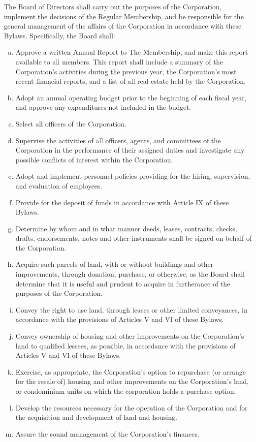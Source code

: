 The Board of Directors shall carry out the purposes of the
Corporation, implement the decisions of the Regular Membership, and be
responsible for the general management of the affairs of the
Corporation in accordance with these Bylaws. Specifically, the Board
shall:
\begin{enumerate}[a.]
\item Approve a written Annual Report to The Membership, and make this
  report available to all members. This report shall include a summary
  of the Corporation’s activities during the previous year, the
  Corporation’s most recent financial reports, and a list of all real
  estate held by the Corporation.
\item Adopt an annual operating budget prior to the beginning of each
  fiscal year, and approve any expenditures not included in the
  budget.
\item Select all officers of the Corporation.
\item Supervise the activities of all officers, agents, and committees
  of the Corporation in the performance of their assigned duties and
  investigate any possible conflicts of interest within the
  Corporation.
\item Adopt and implement personnel policies providing for the hiring,
  supervision, and evaluation of employees.
\item Provide for the deposit of funds in accordance with Article IX
  of these Bylaws.
\item Determine by whom and in what manner deeds, leases, contracts,
  checks, drafts, endorsements, notes and other instruments shall be
  signed on behalf of the Corporation.
\item Acquire such parcels of land, with or without buildings and
  other improvements, through donation, purchase, or otherwise, as the
  Board shall determine that it is useful and prudent to acquire in
  furtherance of the purposes of the Corporation.
\item Convey the right to use land, through leases or other limited
  conveyances, in accordance with the provisions of Articles V and VI
  of these Bylaws.
\item Convey ownership of housing and other improvements on the
  Corporation’s land to qualified lessees, as possible, in accordance with the
  provisions of Articles V and VI of these Bylaws.
\item Exercise, as appropriate, the Corporation’s option to repurchase
  (or arrange for the resale of) housing and other improvements on the
  Corporation’s land, or condominium units on which the corporation
  holds a purchase option.
\item Develop the resources necessary for the operation of the
  Corporation and for the acquisition and development of land and
  housing.
\item Assure the sound management of the Corporation’s finances.
\end{enumerate}

